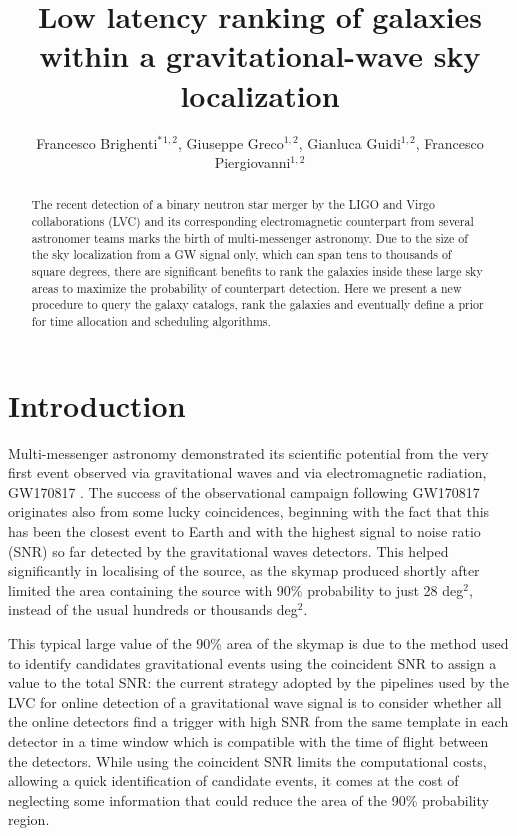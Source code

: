 \documentclass[aps, prd, twocolumn, superscriptaddress, nofootinbib]{revtex4-1}
\begin{document}
\title{Low latency ranking of galaxies within a gravitational-wave sky localization}
\author{Francesco Brighenti$^*$$^{1,2}$, Giuseppe Greco$^{1,2}$, Gianluca Guidi$^{1,2}$, Francesco Piergiovanni$^{1,2}$}

\address{$^{1,2}$Dipartimento di Scienze Pure E Applicate, Universit\`a degli Studi di Urbino "Carlo Bo",\\
Urbino, Italy/INFN-Firenze\\
$^*$E-mail: francesco.brighenti@uniurb.it}

\begin{abstract}
The recent detection of a binary neutron star merger by the LIGO and Virgo collaborations (LVC) and its corresponding electromagnetic counterpart from several astronomer teams marks the birth of multi-messenger astronomy\cite{GW170817}.
Due to the size of the sky localization from a GW signal only, which can span tens to thousands of square degrees, there are significant benefits to rank the galaxies inside these large sky areas to maximize the probability of counterpart detection.
Here we present a new procedure to query the galaxy catalogs, rank the galaxies and eventually define a prior for time allocation and scheduling algorithms.
\end{abstract}
\maketitle

\section{Introduction}

Multi-messenger astronomy demonstrated its scientific potential from the very first event observed via gravitational waves and via electromagnetic radiation, GW170817 \cite{GW170817}. The success of the observational campaign following GW170817 originates also from  some lucky coincidences, beginning with the fact that this has been the closest event to Earth and with the highest signal to noise ratio (SNR) so far detected by the gravitational waves detectors. This helped significantly in localising of the source, as the skymap produced shortly after limited the area containing the source with 90\% probability to just 28 deg$^2$, instead of the usual hundreds or thousands deg$^2$.

 This typical large value of the 90\% area of the skymap is due to the method used to identify candidates gravitational events using the coincident SNR to assign a value to the total SNR:  the current strategy adopted by the pipelines used by the LVC for online detection of a gravitational wave signal is to consider whether all the online detectors find a  trigger with high SNR from the same template in each detector in a time window which is compatible with the time of flight between the detectors. While using the coincident SNR limits the computational costs, allowing a quick identification of candidate events, it comes at the cost of neglecting some information that could reduce the area of the 90\% probability region.
\end{document}

